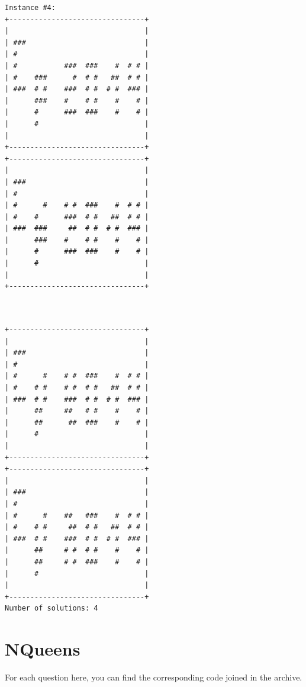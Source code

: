 \documentclass[a4paper ,12pt,french]{article}
\begin{document}
\begin{minipage}[l]{.5\textwidth} 
\begin{verbatim}
Instance #4:
+--------------------------------+
|                                |
| ###                            |
| #                              |
| #           ###  ###    #  # # |
| #    ###      #  # #   ##  # # |
| ###  # #    ###  # #  # #  ### |
|      ###    #    # #    #    # |
|      #      ###  ###    #    # |
|      #                         |
|                                |
+--------------------------------+
+--------------------------------+
|                                |
| ###                            |
| #                              |
| #      #    # #  ###    #  # # |
| #    #      ###  # #   ##  # # |
| ###  ###     ##  # #  # #  ### |
|      ###    #    # #    #    # |
|      #      ###  ###    #    # |
|      #                         |
|                                |
+--------------------------------+
\end{verbatim}
\end{minipage}\hfill 
\begin{minipage}[r]{.5\textwidth} 
\begin{verbatim}


+--------------------------------+
|                                |
| ###                            |
| #                              |
| #      #    # #  ###    #  # # |
| #    # #    # #  # #   ##  # # |
| ###  # #    ###  # #  # #  ### |
|      ##     ##   # #    #    # |
|      ##      ##  ###    #    # |
|      #                         |
|                                |
+--------------------------------+
+--------------------------------+
|                                |
| ###                            |
| #                              |
| #      #    ##   ###    #  # # |
| #    # #     ##  # #   ##  # # |
| ###  # #    ###  # #  # #  ### |
|      ##     # #  # #    #    # |
|      ##     # #  ###    #    # |
|      #                         |
|                                |
+--------------------------------+
Number of solutions: 4
\end{verbatim}
\end{minipage}






\section{NQueens}
For each question here, you can find the corresponding code joined in the archive. 
\end{document}
